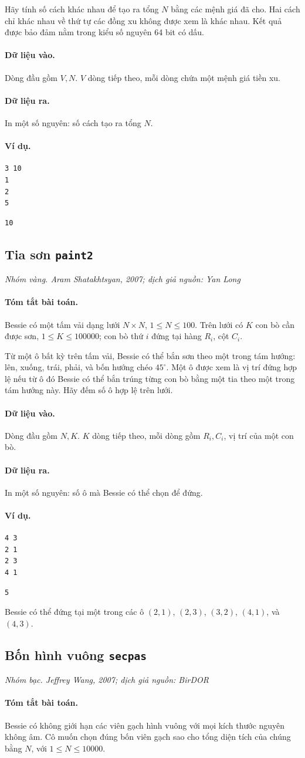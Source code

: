 \documentclass[11pt]{article}
\newcommand{\problem}[4]{%
  \subsection[#1 (#2)]{#1 \hfill {\normalsize\texttt{#2}}}%
  \noindent\textit{#3. #4}\par\smallskip
}
\newcommand{\iosec}[1]{\paragraph{#1}}
\begin{document}
Hãy tính số cách khác nhau để tạo ra tổng \(N\) bằng các mệnh giá đã cho. Hai
cách chỉ khác nhau về thứ tự các đồng xu không được xem là khác nhau. Kết quả
được bảo đảm nằm trong kiểu số nguyên 64 bit có dấu.

\iosec{Dữ liệu vào.}
Dòng đầu gồm \(V,N\). \(V\) dòng tiếp theo, mỗi dòng chứa một mệnh giá tiền
xu.

\iosec{Dữ liệu ra.}
In một số nguyên: số cách tạo ra tổng \(N\).

\iosec{Ví dụ.}
\begin{verbatim}
3 10
1
2
5
\end{verbatim}

\begin{verbatim}
10
\end{verbatim}

\problem{Tia sơn}{paint2}{Nhóm vàng}{Aram Shatakhtsyan, 2007; dịch giả nguồn: Yan Long}

\iosec{Tóm tắt bài toán.}
Bessie có một tấm vải dạng lưới \(N\times N\), \(1\le N\le 100\). Trên lưới
có \(K\) con bò cần được sơn, \(1\le K\le 100000\); con bò thứ \(i\) đứng tại
hàng \(R_i\), cột \(C_i\).

Từ một ô bất kỳ trên tấm vải, Bessie có thể bắn sơn theo một trong tám hướng:
lên, xuống, trái, phải, và bốn hướng chéo \(45^\circ\). Một ô được xem là vị
trí đứng hợp lệ nếu từ ô đó Bessie có thể bắn trúng từng con bò bằng một tia
theo một trong tám hướng này. Hãy đếm số ô hợp lệ trên lưới.

\iosec{Dữ liệu vào.}
Dòng đầu gồm \(N,K\). \(K\) dòng tiếp theo, mỗi dòng gồm \(R_i,C_i\), vị trí
của một con bò.

\iosec{Dữ liệu ra.}
In một số nguyên: số ô mà Bessie có thể chọn để đứng.

\iosec{Ví dụ.}
\begin{verbatim}
4 3
2 1
2 3
4 1
\end{verbatim}

\begin{verbatim}
5
\end{verbatim}

Bessie có thể đứng tại một trong các ô \((2,1)\), \((2,3)\), \((3,2)\),
\((4,1)\), và \((4,3)\).

\problem{Bốn hình vuông}{secpas}{Nhóm bạc}{Jeffrey Wang, 2007; dịch giả nguồn: BirDOR}

\iosec{Tóm tắt bài toán.}
Bessie có không giới hạn các viên gạch hình vuông với mọi kích thước nguyên
không âm. Cô muốn chọn đúng bốn viên gạch sao cho tổng diện tích của chúng
bằng \(N\), với \(1\le N\le 10000\).
\end{document}
